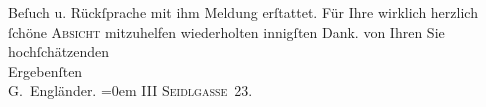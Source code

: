 \begin{ledgroupsized}[t]{13cm}
                    Beſuch u. Rückſprache mit ihm Meldung erſtattet.\pend
           \pstart
           Für Ihre wirklich herzlich ſchöne \textsc{Absicht} mitzuhelfen
                    wiederholten innigſten Dank.\pend
           \pstart
           von Ihren Sie hochſchätzenden{\\[\baselineskip]}Ergebenſten{\\[\baselineskip]}\spacefill\mbox{G. Engländer.}\pend
           \leftskip=0em{}\pstart
           \noindent{}\textsc{III Seidlgasse 23.}\pend
                     \endnumbering{}\end{ledgroupsized}  \newcommand{\dateiname}{L02123}\newcommand{\titel}{Georg Engländer an Arthur Schnitzler, 18. 4. 1913}\newcommand{\editorInnen}{Martin Anton Müller und Gerd-Hermann Susen}
            \footnotesize
\begin{ledgroupsized}[t]{11.5cm}
\end{ledgroupsized}
         
      